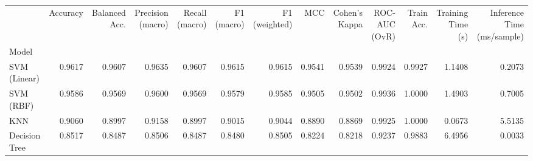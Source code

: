 \begin{tabular}{lrrrrrrrrrrrr}
\toprule
 & Accuracy & Balanced Acc. & Precision (macro) & Recall (macro) & F1 (macro) & F1 (weighted) & MCC & Cohen's Kappa & ROC-AUC (OvR) & Train Acc. & Training Time (s) & Inference Time (ms/sample) \\
Model &  &  &  &  &  &  &  &  &  &  &  &  \\
\midrule
SVM (Linear) & 0.9617 & 0.9607 & 0.9635 & 0.9607 & 0.9615 & 0.9615 & 0.9541 & 0.9539 & 0.9924 & 0.9927 & 1.1408 & 0.2073 \\
SVM (RBF) & 0.9586 & 0.9569 & 0.9600 & 0.9569 & 0.9579 & 0.9585 & 0.9505 & 0.9502 & 0.9936 & 1.0000 & 1.4903 & 0.7005 \\
KNN & 0.9060 & 0.8997 & 0.9158 & 0.8997 & 0.9015 & 0.9044 & 0.8890 & 0.8869 & 0.9925 & 1.0000 & 0.0673 & 5.5135 \\
Decision Tree & 0.8517 & 0.8487 & 0.8506 & 0.8487 & 0.8480 & 0.8505 & 0.8224 & 0.8218 & 0.9237 & 0.9883 & 6.4956 & 0.0033 \\
\bottomrule
\end{tabular}
